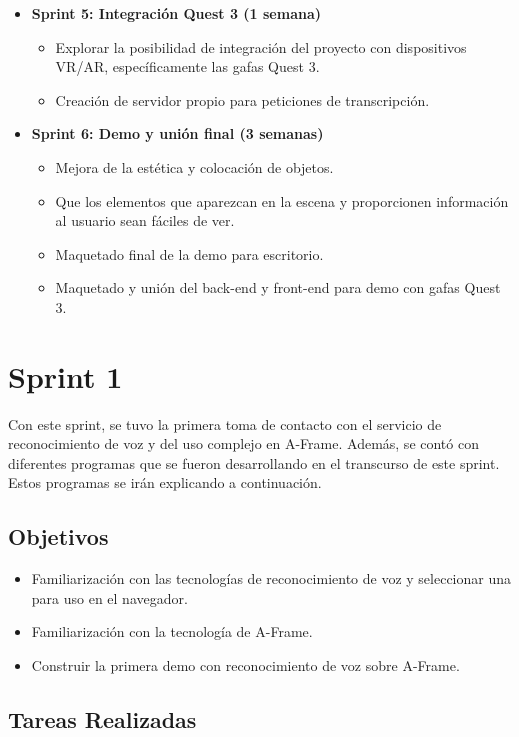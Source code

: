 \documentclass[a4paper, 12pt]{book}
\begin{document}
\begin{itemize}
 \item \textbf{Sprint 5: Integración Quest 3 (1 semana)}
  \begin{itemize}
   \item Explorar la posibilidad de integración del proyecto con dispositivos VR/AR, específicamente las gafas Quest 3.
  \item Creación de servidor propio para peticiones de transcripción.
  \end{itemize}

 \item \textbf{Sprint 6: Demo y unión final (3 semanas)}
 \begin{itemize}
   \item Mejora de la estética y colocación de objetos.
 \item Que los elementos que aparezcan en la escena y proporcionen información al usuario sean fáciles de ver.
 \item Maquetado final de la demo para escritorio.
 \item Maquetado y unión del back-end y front-end para demo con gafas Quest 3.
 \end{itemize}
\end{itemize}

\section{Sprint 1}
\label{sec:sprint1}

Con este sprint, se tuvo la primera toma de contacto con el servicio de reconocimiento de voz y del uso complejo en A-Frame.
Además, se contó con diferentes programas que se fueron desarrollando en el transcurso de este sprint. Estos programas se irán explicando a continuación.
\subsection{Objetivos}
 \begin{itemize}
  \item Familiarización con las tecnologías de reconocimiento de voz y seleccionar una para uso en el navegador.
  \item Familiarización con la tecnología de A-Frame.
  \item Construir la primera demo con reconocimiento de voz sobre A-Frame.
 \end{itemize}

\subsection{Tareas Realizadas}
\end{document}
